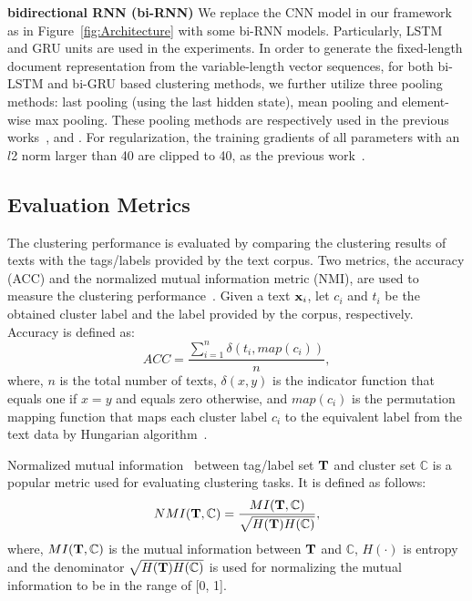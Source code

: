 \documentclass[review]{elsarticle}
\begin{document}
{\bf{bidirectional RNN (bi-RNN)}} We replace the CNN model in our framework as in Figure~\ref{fig:Architecture} with some bi-RNN models. Particularly, LSTM and GRU units are used in the experiments. In order to generate the fixed-length document representation from the variable-length vector sequences, for both bi-LSTM and bi-GRU based clustering methods, we further utilize three pooling methods:  last pooling (using the last hidden state), mean pooling and element-wise max pooling. These pooling methods are respectively used in the previous works~\cite{palangi2015deep,cho2014learning}, \cite{tang2015document} and \cite{14_lai2015rcnn}. For regularization, the training gradients of all parameters with an \(l\)2 norm larger than 40 are clipped to 40, as the previous work~\cite{sukhbaatar2015end}.


\subsection{Evaluation Metrics}
The clustering performance is evaluated by comparing the clustering results of texts with the tags/labels provided by the text corpus. Two metrics, the accuracy (ACC) and the normalized mutual information metric (NMI), are used to measure the clustering performance~\cite{4_cai2005document,1_huang2014deep}. Given a text \({{\bf{x}}_i}\), let \({c_i}\) and \({t_i}\) be the obtained cluster label and the label provided by the corpus, respectively.
Accuracy is defined as:
\begin{equation}
ACC = \frac{{\sum\nolimits_{i = 1}^n {\delta ({t_i},map({c_i}))} }}{n},
\label{eq:ACC}
\end{equation}
where, \(n\) is the total number of texts, \(\delta (x,y)\) is the indicator function that equals one if \(x = y\) and equals zero otherwise, and \(map({c_i})\) is the permutation mapping function that maps each cluster label \({c_i}\) to the equivalent label from the text data by Hungarian algorithm~\cite{7_papadimitriou1998combinatorial}.

Normalized mutual information~\cite{8_chen2011parallel} between tag/label set \({\bf{T}}\) and cluster set \({\mathbb{C}}\) is a popular metric used for evaluating clustering tasks. It is defined as follows:
\begin{equation}
NMI({\bf{T}},{\mathbb{C}}) = \frac{{MI({\bf{T}},{\mathbb{C}})}}{{\sqrt {H({\bf{T}})H({\mathbb{C}})} }},
\label{eq:NMI}
\end{equation}
where, \(MI({\bf{T}},{\mathbb{C}})\) is the mutual information between \({\bf{T}}\) and \({\mathbb{C}}\), \(H( \cdot )\) is entropy and the denominator \(\sqrt {H({\bf{T}})H({\mathbb{C}})} \) is used for normalizing the mutual information to be in the range of [0, 1].
\end{document}
